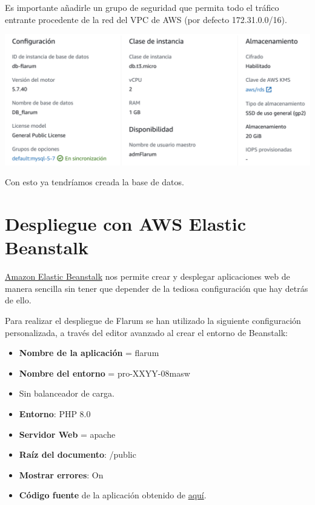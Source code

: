 \documentclass{\ClassPath/viu-tfm-template}
\begin{document}
Es importante añadirle un grupo de seguridad que permita todo el tráfico entrante procedente de la red del VPC de AWS (por defecto 172.31.0.0/16).


\begin{center}
    \includegraphics[frame,width=0.8\linewidth]{img/rds.png}
\end{center}

Con esto ya tendríamos creada la base de datos.


\chapter{Despliegue con AWS Elastic Beanstalk}

\href{https://aws.amazon.com/es/elasticbeanstalk/}{Amazon Elastic Beanstalk} nos permite crear y desplegar aplicaciones web de manera sencilla sin tener que depender de la tediosa configuración que hay detrás de ello.

Para realizar el despliegue de Flarum se han utilizado la siguiente configuración personalizada, a través del editor avanzado al crear el entorno de Beanstalk:
\vspace{-15pt}
\begin{itemize}
    \item \textbf{Nombre de la aplicación} = flarum
    \item \textbf{Nombre del entorno} = pro-XXYY-08masw
    \item Sin balanceador de carga.
    \item \textbf{Entorno}: PHP 8.0
    \item \textbf{Servidor Web} = apache
    \item \textbf{Raíz del documento}: /public
    \item \textbf{Mostrar errores}: On
    \item \textbf{Código fuente} de la aplicación obtenido de \href{https://amn-viu-resources-public.s3.eu-west-1.amazonaws.com/08masw/actividad2/flarum_php8.0.zip}{aquí}.
\end{itemize}
\end{document}
